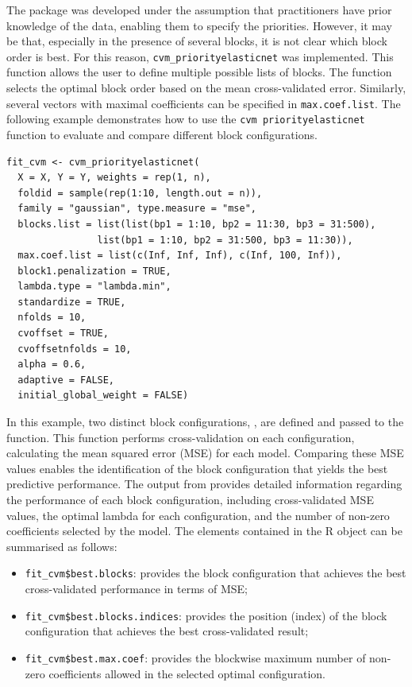 The  package was developed under the assumption that practitioners have prior knowledge of the data, enabling them to specify the priorities. However, it may be that, especially in the presence of several blocks, it is not clear which block order is best. For this reason, \texttt{cvm\_priorityelasticnet} was implemented. This function allows the user to define multiple possible lists of blocks. The function selects the optimal block order based on the mean cross-validated error. Similarly, several vectors with maximal coefficients can be specified in \texttt{max.coef.list}. The following example demonstrates how to use the \texttt{cvm priorityelasticnet} function to evaluate and compare different block configurations. 
{\small
\begin{lstlisting}
fit_cvm <- cvm_priorityelasticnet(
  X = X, Y = Y, weights = rep(1, n),
  foldid = sample(rep(1:10, length.out = n)),
  family = "gaussian", type.measure = "mse",
  blocks.list = list(list(bp1 = 1:10, bp2 = 11:30, bp3 = 31:500),
                list(bp1 = 1:10, bp2 = 31:500, bp3 = 11:30)),
  max.coef.list = list(c(Inf, Inf, Inf), c(Inf, 100, Inf)),
  block1.penalization = TRUE,
  lambda.type = "lambda.min",
  standardize = TRUE,
  nfolds = 10,
  cvoffset = TRUE,
  cvoffsetnfolds = 10,
  alpha = 0.6,
  adaptive = FALSE,
  initial_global_weight = FALSE)
\end{lstlisting}
}
In this example, two distinct block configurations, , are defined and passed to the  function. This function performs cross-validation on each configuration, calculating the mean squared error (MSE) for each model. Comparing these MSE values enables the identification of the block configuration that yields the best predictive performance.
The output from  provides detailed information regarding the performance of each block configuration, including cross-validated MSE values, the optimal lambda for each configuration, and the number of non-zero coefficients selected by the model. The elements contained in the R object  can be summarised as follows:
\begin{itemize}
\item \texttt{fit\_cvm\$best.blocks}: provides the block configuration that achieves the best cross-validated performance in terms of MSE;

\item \texttt{fit\_cvm\$best.blocks.indices}: provides the position (index) of the block configuration that achieves the best cross-validated result;

\item \texttt{fit\_cvm\$best.max.coef}: provides the blockwise maximum number of non-zero coefficients allowed in the selected optimal configuration.

\end{itemize}

